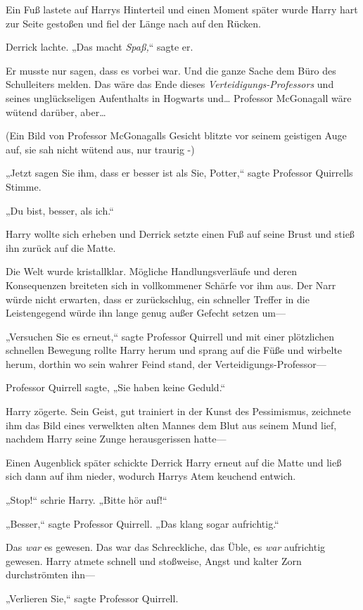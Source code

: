{Ein Fuß lastete auf Harrys Hinterteil und einen Moment später wurde Harry hart zur Seite gestoßen und fiel der Länge nach auf den Rücken.

Derrick lachte. „Das macht \emph{Spaß,}“ sagte er.

Er musste nur sagen, dass es vorbei war. Und die ganze Sache dem Büro des Schulleiters melden. Das wäre das Ende dieses \emph{Verteidigungs-Professors} und seines unglückseligen Aufenthalts in Hogwarts und… Professor McGonagall wäre wütend darüber, aber…

(Ein Bild von Professor McGonagalls Gesicht blitzte vor seinem geistigen Auge auf, sie sah nicht wütend aus, nur traurig -)

„Jetzt sagen Sie ihm, dass er besser ist als Sie, Potter,“ sagte Professor Quirrells Stimme.

„Du bist, besser, als ich.“

Harry wollte sich erheben und Derrick setzte einen Fuß auf seine Brust und stieß ihn zurück auf die Matte.

Die Welt wurde kristallklar. Mögliche Handlungsverläufe und deren Konsequenzen breiteten sich in vollkommener Schärfe vor ihm aus. Der Narr würde nicht erwarten, dass er zurückschlug, ein schneller Treffer in die Leistengegend würde ihn lange genug außer Gefecht setzen um—

„Versuchen Sie es erneut,“ sagte Professor Quirrell und mit einer plötzlichen schnellen Bewegung rollte Harry herum und sprang auf die Füße und wirbelte herum, dorthin wo sein wahrer Feind stand, der Verteidigungs-Professor—

Professor Quirrell sagte, „Sie haben keine Geduld.“

Harry zögerte. Sein Geist, gut trainiert in der Kunst des Pessimismus, zeichnete ihm das Bild eines verwelkten alten Mannes dem Blut aus seinem Mund lief, nachdem Harry seine Zunge herausgerissen hatte—

Einen Augenblick später schickte Derrick Harry erneut auf die Matte und ließ sich dann auf ihm nieder, wodurch Harrys Atem keuchend entwich.

„Stop!“ schrie Harry. „Bitte hör auf!“

„Besser,“ sagte Professor Quirrell. „Das klang sogar aufrichtig.“

Das \emph{war} es gewesen. Das war das Schreckliche, das Üble, es \emph{war} aufrichtig gewesen. Harry atmete schnell und stoßweise, Angst und kalter Zorn durchströmten ihn—

„Verlieren Sie,“ sagte Professor Quirrell.

}
